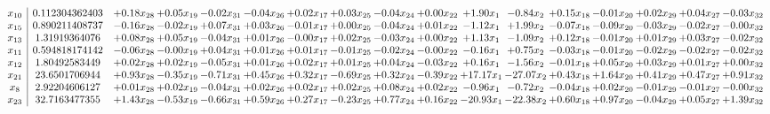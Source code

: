 \documentclass[9pt]{article}
\begin{document}
 \[\begin{array}{c| c c@{\hskip 2pt} c@{\hskip 2pt} c@{\hskip 2pt} c@{\hskip 2pt} c@{\hskip 2pt} c@{\hskip 2pt} c@{\hskip 2pt} c@{\hskip 2pt} c@{\hskip 2pt} c@{\hskip 2pt} c@{\hskip 2pt} c@{\hskip 2pt} c@{\hskip 2pt} c@{\hskip 2pt} c@{\hskip 2pt} }
 x_{10}   &  0.112304362403 & +  0.18 x_{28} & +  0.05 x_{19} & -0.02 x_{31} & -0.04 x_{26} & +  0.02 x_{17} & +  0.03 x_{25} & -0.04 x_{24} & +  0.00 x_{22} & +  1.90 x_{1} & -0.84 x_{2} & +  0.15 x_{18} & -0.01 x_{20} & +  0.02 x_{29} & +  0.04 x_{27} & -0.03 x_{32}\\
 x_{15}   &  0.890211408737 & -0.16 x_{28} & -0.02 x_{19} & +  0.07 x_{31} & +  0.03 x_{26} & -0.01 x_{17} & +  0.00 x_{25} & -0.04 x_{24} & +  0.01 x_{22} & -1.12 x_{1} & +  1.99 x_{2} & -0.07 x_{18} & -0.09 x_{20} & -0.03 x_{29} & -0.02 x_{27} & -0.00 x_{32}\\
 x_{13}   &  1.31919364076 & +  0.08 x_{28} & +  0.05 x_{19} & -0.04 x_{31} & +  0.01 x_{26} & -0.00 x_{17} & +  0.02 x_{25} & -0.03 x_{24} & +  0.00 x_{22} & +  1.13 x_{1} & -1.09 x_{2} & +  0.12 x_{18} & -0.01 x_{20} & +  0.01 x_{29} & +  0.03 x_{27} & -0.02 x_{32}\\
 x_{11}   &  0.594818174142 & -0.06 x_{28} & -0.00 x_{19} & +  0.04 x_{31} & +  0.01 x_{26} & +  0.01 x_{17} & -0.01 x_{25} & -0.02 x_{24} & -0.00 x_{22} & -0.16 x_{1} & +  0.75 x_{2} & -0.03 x_{18} & -0.01 x_{20} & -0.02 x_{29} & -0.02 x_{27} & -0.02 x_{32}\\
 x_{12}   &  1.80492583449 & +  0.02 x_{28} & +  0.02 x_{19} & -0.05 x_{31} & +  0.01 x_{26} & +  0.02 x_{17} & +  0.01 x_{25} & +  0.04 x_{24} & -0.03 x_{22} & +  0.16 x_{1} & -1.56 x_{2} & -0.01 x_{18} & +  0.05 x_{20} & +  0.03 x_{29} & +  0.01 x_{27} & +  0.00 x_{32}\\
 x_{21}   &  23.6501706944 & +  0.93 x_{28} & -0.35 x_{19} & -0.71 x_{31} & +  0.45 x_{26} & +  0.32 x_{17} & -0.69 x_{25} & +  0.32 x_{24} & -0.39 x_{22} & + 17.17 x_{1} & -27.07 x_{2} & +  0.43 x_{18} & +  1.64 x_{20} & +  0.41 x_{29} & +  0.47 x_{27} & +  0.91 x_{32}\\
 x_{8}   &  2.92204606127 & +  0.01 x_{28} & +  0.02 x_{19} & -0.04 x_{31} & +  0.02 x_{26} & +  0.02 x_{17} & +  0.02 x_{25} & +  0.08 x_{24} & +  0.02 x_{22} & -0.96 x_{1} & -0.72 x_{2} & -0.04 x_{18} & +  0.02 x_{20} & -0.01 x_{29} & -0.01 x_{27} & -0.00 x_{32}\\
 x_{23}   &  32.7163477355 & +  1.43 x_{28} & -0.53 x_{19} & -0.66 x_{31} & +  0.59 x_{26} & +  0.27 x_{17} & -0.23 x_{25} & +  0.77 x_{24} & +  0.16 x_{22} & -20.93 x_{1} & -22.38 x_{2} & +  0.60 x_{18} & +  0.97 x_{20} & -0.04 x_{29} & +  0.05 x_{27} & +  1.39 x_{32}\\

\end{array}\]
\end{document}
